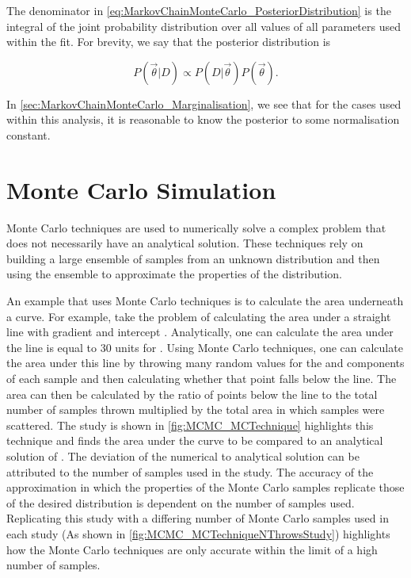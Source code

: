 The denominator in \autoref{eq:MarkovChainMonteCarlo_PosteriorDistribution} is the integral of the joint probability distribution over all values of all parameters used within the fit. For brevity, we say that the posterior distribution is

\begin{equation}
  \label{eq:MarkovChainMonteCarlo_PosteriorDistributionReduced}
  P(\vec{\theta}|D) \propto P(D|\vec{\theta}) P(\vec{\theta}).
\end{equation}

In \autoref{sec:MarkovChainMonteCarlo_Marginalisation}, we see that for the cases used within this analysis, it is reasonable to know the posterior to some normalisation constant.

\section{Monte Carlo Simulation}
\label{sec:MarkovChainMonteCarlo_MonteCarloSimulation}
Monte Carlo techniques are used to numerically solve a complex problem that does not necessarily have an analytical solution. These techniques rely on building a large ensemble of samples from an unknown distribution and then using the ensemble to approximate the properties of the distribution.

An example that uses Monte Carlo techniques is to calculate the area underneath a curve. For example, take the problem of calculating the area under a straight line with gradient  and intercept . Analytically, one can calculate the area under the line is equal to 30 units for . Using Monte Carlo techniques, one can calculate the area under this line by throwing many random values for the  and  components of each sample and then calculating whether that point falls below the line. The area can then be calculated by the ratio of points below the line to the total number of samples thrown multiplied by the total area in which samples were scattered. The study is shown in \autoref{fig:MCMC_MCTechnique} highlights this technique and finds the area under the curve to be  compared to an analytical solution of . The deviation of the numerical to analytical solution can be attributed to the number of samples used in the study. The accuracy of the approximation in which the properties of the Monte Carlo samples replicate those of the desired distribution is dependent on the number of samples used. Replicating this study with a differing number of Monte Carlo samples used in each study (As shown in \autoref{fig:MCMC_MCTechniqueNThrowsStudy}) highlights how the Monte Carlo techniques are only accurate within the limit of a high number of samples.

